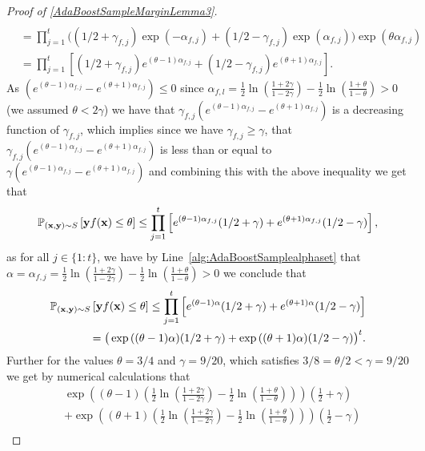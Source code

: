 \begin{proof}[Proof of \cref{AdaBoostSampleMarginLemma3}]
\begin{align*}
    \\
    &=\prod_{j=1}^{t} \Big((1/2+\gamma_{f,j})\exp(-\alpha_{f,j})+(1/2-\gamma_{f,j})\exp(\alpha_{f,j})\Big)\exp{\left( \theta{\alpha_{f,j}}\right)}
    \\
    &=
    \prod_{j=1}^{t} \left[(1/2+\gamma_{f,j})e^{(\theta-1)\alpha_{f,j}}+(1/2-\gamma_{f,j})e^{(\theta+1)\alpha_{f,j}}\right].
      \end{align*}
    As $\left(e^{(\theta-1)\alpha_{f,j}}-e^{(\theta+1)\alpha_{f,j}}\right)\leq 0$ since  $ \alpha_{f,l}= \frac{1}{2}\ln{\left(\frac{1+2\gamma}{1-2\gamma}\right)- \frac{1}{2}\ln{\left(\frac{1+\theta}{1-\theta} \right)}}>0$  (we assumed $ \theta< 2\gamma $)  we have that $\gamma_{f,j}\left(e^{(\theta-1)\alpha_{f,j}}-e^{(\theta+1)\alpha_{f,j}}\right)$ is a decreasing function of $\gamma_{f,j}$, which implies since we have $\gamma_{f,j}\geq \gamma$,  that  $\gamma_{f,j}\left(e^{(\theta-1)\alpha_{f,j}}-e^{(\theta+1)\alpha_{f,j}}\right)$ is less than or equal to $\gamma\left(e^{(\theta-1)\alpha_{f,j}}-e^{(\theta+1)\alpha_{f,j}}\right)$ 
    and combining this with the above inequality we get that  
    \begin{align*}
      \mathbb{P}_{(\mathbf{x},\mathbf{y})\sim S}\left[\mathbf{y} f(\mathbf{x})\leq \theta \right]
      \leq 
      \prod_{j=1}^{t} \left[e^{(\theta-1)\alpha_{f,j}}(1/2+\gamma)+e^{(\theta+1)\alpha_{f,j}}(1/2-\gamma)\right],
        \end{align*}
    as for all $ j\in\{ 1:t \} $, we have by Line~\ref{alg:AdaBoostSamplealphaset}  that $\alpha=\alpha_{f,j}=\frac{1}{2}\ln{\left(\frac{1+2\gamma}{1-2\gamma}\right)- \frac{1}{2}\ln{\left(\frac{1+\theta}{1-\theta} \right)}}>0$ we conclude that
    \begin{align*}
      \mathbb{P}_{(\mathbf{x},\mathbf{y})\sim S}\left[\mathbf{y} f(\mathbf{x})\leq \theta \right]
      \leq 
      \prod_{j=1}^{t} \left[e^{(\theta-1)\alpha}(1/2+\gamma)+e^{(\theta+1)\alpha}(1/2-\gamma)\right]\\
      =\big(\exp{((\theta-1)\alpha)}(1/2+\gamma)+\exp{((\theta+1)\alpha)}(1/2-\gamma)\big)^{t}.
        \end{align*}
    Further for the values $ \theta=3/4 $ and $ \gamma=9/20 $, which satisfies $ 3/8 =\theta/2 < \gamma=9/20 $  we get by numerical calculations that 
    \begin{align*}
      &\exp{\left(\left(\theta-1\right)\left(\frac{1}{2}\ln{\left(\frac{1+2\gamma}{1-2\gamma}\right)- \frac{1}{2}\ln{\left(\frac{1+\theta}{1-\theta} \right)}}\right)\right)}\left(\frac{1}{2}+\gamma\right)
      \\&+\exp{\left(\left(\theta+1\right)\left(\frac{1}{2}\ln{\left(\frac{1+2\gamma}{1-2\gamma}\right)- \frac{1}{2}\ln{\left(\frac{1+\theta}{1-\theta} \right)}}\right)\right)}\left(\frac{1}{2}-\gamma\right)\\

\end{align*}
\end{proof}
